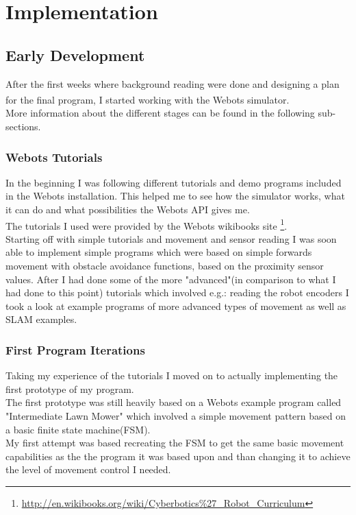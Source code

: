 \chapter{Implementation}

\section{Early Development}
After the first weeks where background reading were done and designing a plan for the final program, I started working with the Webots\textsuperscript{\texttrademark} simulator. \\ More information about the different stages can be found in the following sub-sections. 

\subsection{Webots Tutorials}
In the beginning I was following different tutorials and demo  programs included in the Webots installation. 
This helped me to see how the simulator works, what it can do and what possibilities the Webots API gives me. \\
The tutorials I used were provided by the Webots wikibooks site \footnote{\url{http://en.wikibooks.org/wiki/Cyberbotics\%27_Robot_Curriculum}}.\\
Starting off with simple tutorials and movement and sensor reading I was soon able to implement simple programs which were based on simple forwards movement with obstacle avoidance functions, based on the proximity sensor values. 
After I had done some of the more "advanced"(in comparison to what I had done to this point) tutorials which involved e.g.: reading the robot encoders   I took a look at example programs of more advanced types of movement as well as SLAM examples. \\

\subsection{First Program Iterations}
Taking my experience of the tutorials I moved on to actually implementing the first prototype of my program. \\
The first prototype was still heavily based on a Webots example program called "Intermediate Lawn Mower" which involved a simple movement pattern based on a basic finite state machine(FSM). \\ My first attempt was based recreating the FSM to get the same basic movement capabilities as the the program it was based upon and than changing it to achieve the level of movement control I needed. \\[3ex]

